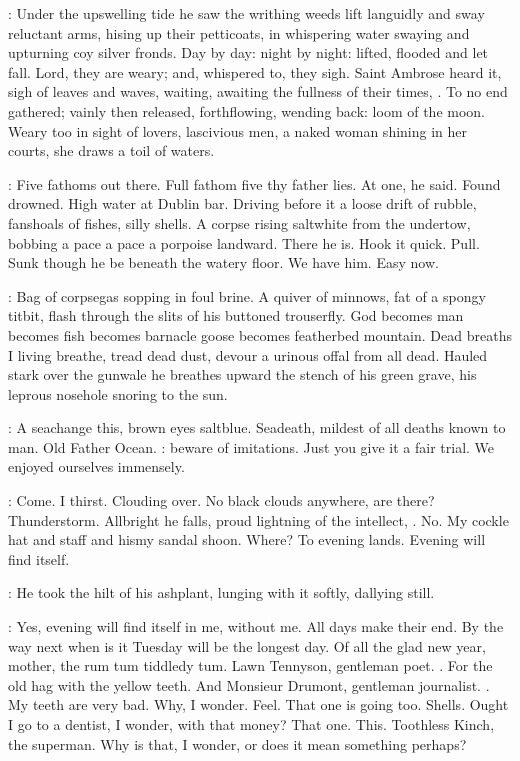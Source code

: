 :
Under the upswelling tide
he saw the writhing weeds lift languidly
and sway reluctant arms,
hising up their petticoats,
in whispering water swaying and upturning coy silver fronds.
Day by day:
night by night:
lifted, flooded and let fall.
Lord, they are weary;
and, whispered to, they sigh.
Saint Ambrose heard it,
sigh of leaves and waves,
waiting, awaiting the fullness of their times,
.
To no end gathered;
vainly then released, forthflowing,
wending back:
loom of the moon.
Weary too in sight of lovers,
lascivious men,
a naked woman shining in her courts,
she draws a toil of waters.

\StephenInt:
Five fathoms out there.
Full fathom five thy father lies.
At one, he said.
Found drowned.
High water at Dublin bar.
Driving before it a loose drift of rubble,
fanshoals of fishes, silly shells.
A corpse rising saltwhite from the undertow,
bobbing a pace a pace a porpoise landward.
There he is.
Hook it quick.
Pull.
Sunk though he be beneath the watery floor.
We have him.
Easy now.

\StephenInt:
Bag of corpsegas sopping in foul brine.
A quiver of minnows,
fat of a spongy titbit,
flash through the slits of his buttoned trouserfly.
God becomes man
becomes fish
becomes barnacle goose
becomes featherbed mountain.
Dead breaths I living breathe,
tread dead dust,
devour a urinous offal from all dead.
Hauled stark over the gunwale
he breathes upward the stench of his green grave,
his leprous nosehole snoring to the sun.

\StephenInt:
A seachange this, brown eyes saltblue.
Seadeath, mildest of all deaths known to man.
Old Father Ocean.
:
beware of imitations.
Just you give it a fair trial.
We enjoyed ourselves immensely.

\StephenInt:
Come.
I thirst.
Clouding over.
No black clouds anywhere, are there?
Thunderstorm.
Allbright he falls, proud lightning of the intellect,
.
No.
My cockle hat and staff and hismy sandal shoon.
Where?
To evening lands.
Evening will find itself.

:
He took the hilt of his ashplant,
lunging with it softly, dallying still.

\StephenInt:
Yes, evening will find itself in me,
without me.
All days make their end.
By the way next when is it Tuesday
will be the longest day.
Of all the glad new year,
mother, the rum tum tiddledy tum.
Lawn Tennyson, gentleman poet.
.
For the old hag with the yellow teeth.
And Monsieur Drumont,
gentleman journalist.
.
My teeth are very bad.
Why, I wonder.
Feel.
That one is going too.
Shells.
Ought I go to a dentist, I wonder, with that money?
That one.
This.
Toothless Kinch, the superman.
Why is that, I wonder,
or does it mean something perhaps?

